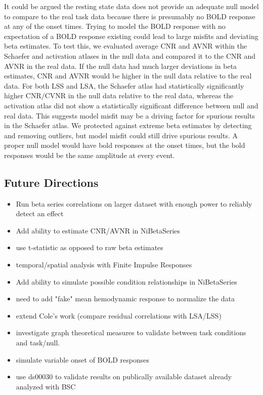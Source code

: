 \documentclass[10pt,letterpaper]{article}
\begin{document}
It could be argued the resting state data does not provide an adequate null model
to compare to the real task data because there is presumably no BOLD response at any
of the onset times.
Trying to model the BOLD response with no expectation of a BOLD response existing could lead
to large misfits and deviating beta estimates.
To test this, we evaluated average CNR and AVNR within the Schaefer and activation atlases in
the null data and compared it to the CNR and AVNR in the real data.
If the null data had much larger deviations in beta estimates, CNR and AVNR would be higher
in the null data relative to the real data.
For both LSS and LSA, the Schaefer atlas had statistically significantly higher
CNR/CVNR in the null data relative to the real data, whereas the activation atlas
did not show a statistically significant difference between null and real data.
This suggests model misfit may be a driving factor for spurious results in the Schaefer atlas.
We protected against extreme beta estimates by detecting and removing outliers, but model misfit
could still drive spurious results.
A proper null model would have bold responses at the onset times, but the bold responses
would be the same amplitude at every event.

\subsection*{Future Directions}

\begin{itemize}
  \item Run beta series correlations on larger dataset with enough power to reliably detect an effect
  \item Add ability to estimate CNR/AVNR in NiBetaSeries
  \item use t-statistic as opposed to raw beta estimates
  \item temporal/spatial analysis with Finite Impulse Responses \cite{Turner2012a}
  \item Add ability to simulate possible condition relationships in NiBetaSeries
  \item need to add "fake" mean hemodynamic response to normalize the data
  \item extend Cole's work (compare residual correlations with LSA/LSS)
  \item investigate graph theoretical measures to validate between task conditions and task/null.
  \item simulate variable onset of BOLD responses
  \item use ds00030 to validate results on publically available dataset already analyzed with BSC ~\cite{Di2019a}
\end{itemize}
\end{document}
